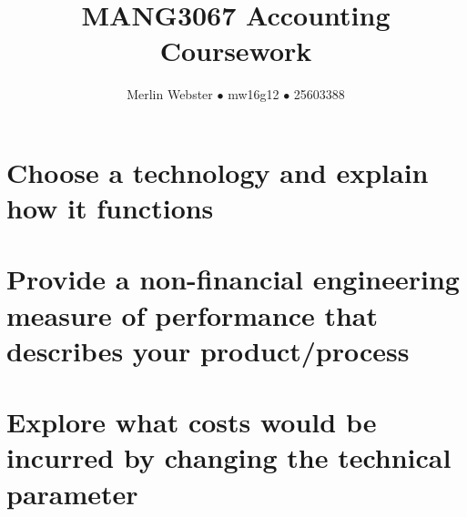 \documentclass[11pt]{article}
\begin{document}
\title{MANG3067 Accounting Coursework}
\author{Merlin Webster $\bullet$ mw16g12 $\bullet$ 25603388}
\date{}
\maketitle

\section{Choose a technology and explain how it functions}
\section{Provide a non-financial engineering measure of performance that describes your product/process}
\section{Explore what costs would be incurred by changing the technical parameter}
\end{document}

